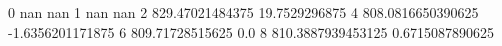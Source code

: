 0 nan nan
1 nan nan
2 829.47021484375 19.7529296875
4 808.0816650390625 -1.6356201171875
6 809.71728515625 0.0
8 810.3887939453125 0.6715087890625
